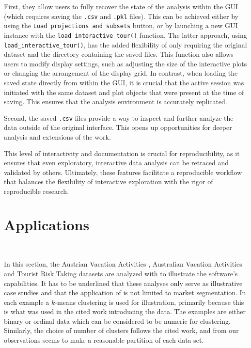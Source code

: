 \documentclass[article]{ajs}
\begin{document}
First, they allow users to fully recover the state of the analysis within the GUI (which requires saving the \texttt{.csv} and \texttt{.pkl} files). This can be achieved either by using the \texttt{Load projections and subsets} button, or by launching a new GUI instance with the \texttt{load\_interactive\_tour()} function. The latter approach, using \texttt{load\_interactive\_tour()}, has the added flexibility of only requiring the original dataset and the directory containing the saved files. This function also allows users to modify display settings, such as adjusting the size of the interactive plots or changing the arrangement of the display grid. In contrast, when loading the saved state directly from within the GUI, it is crucial that the active session was initiated with the same dataset and plot objects that were present at the time of saving. This ensures that the analysis environment is accurately replicated.

Second, the saved \texttt{.csv} files provide a way to inspect and further analyze the data outside of the original interface. This opens up opportunities for deeper analysis and extensions of the work.

This level of interactivity and documentation is crucial for reproducibility, as it ensures that even exploratory, interactive data analysis can be retraced and validated by others. Ultimately, these features facilitate a reproducible workflow that balances the flexibility of interactive exploration with the rigor of reproducible research.


\section{Applications}~\label{applications}

In this section, the Austrian Vacation Activities \citep{dolnicar2003winter}, Australian Vacation Activities \citep{cliff2009formative} and Tourist Risk Taking \citep{dolnicar2017peer} datasets are analyzed with  to illustrate the software's capabilities. It has to be underlined that these analyses only serve as illustrative case studies and that the application of  is not limited to market segmentation. In each example a $k$-means clustering is used for illustration, primarily because this is what was used in the cited work introducing the data. The examples are either binary or ordinal data which can be considered to be numeric for clustering. Similarly, the choice of number of clusters follows the cited work, and from our observations seems to make a reasonable partition of each data set. 
\end{document}
